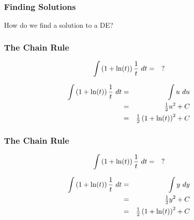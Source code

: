 %
%
%




\begin{frame}
  \frametitle{Finding Solutions}

  How do we find a solution to a DE?



\end{frame}


\begin{frame}
  \frametitle{The Chain Rule}

  \begin{eqnarray*}
    \int \left( 1 + \ln(t) \right) \frac{1}{t} ~ dt & = & ?
  \end{eqnarray*}


   {
    \begin{eqnarray*}
      \int \left( 1 + \ln(t) \right) \frac{1}{t} ~ dt & = & \int u ~ du \\
      & = & \mbox{$\frac{1}{2}$} u^2 + C \\
      & = & \mbox{$\frac{1}{2}$} \left( 1+\ln(t) \right)^2 + C
    \end{eqnarray*}
  }


\end{frame}

\begin{frame}
  \frametitle{The Chain Rule}

  \begin{eqnarray*}
    \int \left( 1 + \ln(t) \right) \frac{1}{t} ~ dt & = & ?
  \end{eqnarray*}


   {
    \begin{eqnarray*}
      \int \left( 1 + \ln(t) \right) \frac{1}{t} ~ dt & = & \int y ~ dy \\
      & = & \mbox{$\frac{1}{2}$} y^2 + C \\
      & = & \mbox{$\frac{1}{2}$} \left( 1+\ln(t) \right)^2 + C
    \end{eqnarray*}
  }


\end{frame}

